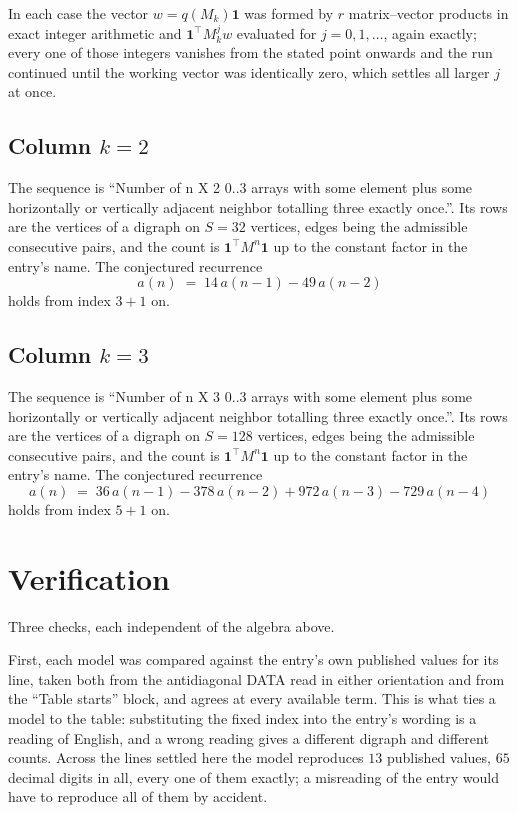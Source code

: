 \documentclass[11pt,a4paper]{article}
\theoremstyle{plain}
\theoremstyle{definition}
\begin{document}
In each case the vector $w=q(M_k)\mathbf{1}$ was formed by $r$ matrix--vector products in
exact integer arithmetic and $\mathbf{1}^{\!\top}M_k^{j}w$ evaluated for $j=0,1,\dots$,
again exactly; every one of those integers vanishes from the stated point onwards and the run
continued until the working vector was identically zero, which settles all larger $j$ at once.

\subsection*{Column $k$$=2$}
The sequence is ``Number of n X 2 0..3 arrays with some element plus some horizontally or vertically adjacent neighbor totalling three exactly once.''. Its rows are the vertices of a digraph on
$S=32$ vertices, edges being the admissible consecutive pairs, and the count is
$\mathbf{1}^{\!\top}M^{n}\mathbf{1}$ up to the constant factor in the entry's name.
The conjectured recurrence
\[
a(n)\;=\;14\,a(n-1) - 49\,a(n-2)
\]
holds from index $3+1$ on.

\subsection*{Column $k$$=3$}
The sequence is ``Number of n X 3 0..3 arrays with some element plus some horizontally or vertically adjacent neighbor totalling three exactly once.''. Its rows are the vertices of a digraph on
$S=128$ vertices, edges being the admissible consecutive pairs, and the count is
$\mathbf{1}^{\!\top}M^{n}\mathbf{1}$ up to the constant factor in the entry's name.
The conjectured recurrence
\[
a(n)\;=\;36\,a(n-1) - 378\,a(n-2) + 972\,a(n-3) - 729\,a(n-4)
\]
holds from index $5+1$ on.

\section{Verification}

Three checks, each independent of the algebra above.

First, each model was compared against the entry's own published values for its line, taken
both from the antidiagonal DATA read in either orientation and from the ``Table starts''
block, and agrees at every available term. This is what ties a model to the table:
substituting the fixed index into the entry's wording is a reading of English, and a wrong
reading gives a different digraph and different counts. Across the lines settled here the
model reproduces $13$ published values, $65$ decimal digits in all, every one of
them exactly; a misreading of the entry would have to reproduce all of them by accident.
\end{document}
